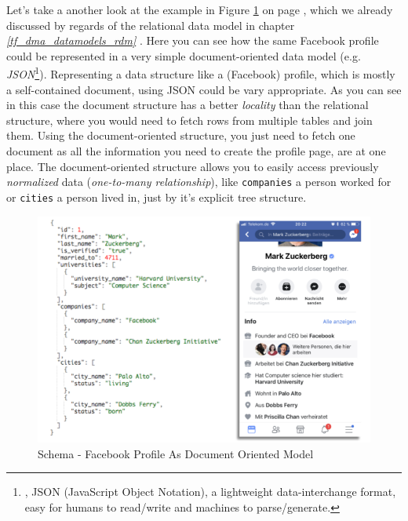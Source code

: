 {Let's take a another look at the example in Figure \ref{schema_facebook_document_oriented_model} on page \pageref{schema_facebook_document_oriented_model}, which we already discussed by regards of the relational data model in chapter \textit{\ref{tf_dma_datamodels_rdm} }. Here you can see how the same Facebook profile could be represented in a very simple document-oriented data model (e.g. \textit{JSON}\footnote{\cite{JSONW}, JSON (JavaScript Object Notation), a lightweight data-interchange format, easy for humans to read/write and machines to parse/generate.}). Representing a data structure like a (Facebook) profile, which is mostly a self-contained document, using JSON could be vary appropriate. As you can see in this case the document structure has a better \textit{locality} than the relational structure, where you would need to fetch rows from multiple tables and join them. Using the document-oriented structure, you just need to fetch one document as all the information you need to create the profile page, are at one place. The document-oriented structure allows you to easily access previously \textit{normalized} data (\textit{one-to-many relationship}), like \lstinline{companies} a person worked for or \lstinline{cities} a person lived in, just by it's explicit tree structure.\\

\begin{figure}[ht]
	\centering
  \includegraphics[width=1\textwidth]{document_oriented_data_model_zuckerberg.png}
	\caption{Schema - Facebook Profile As Document Oriented Model}
	\label{schema_facebook_document_oriented_model}
\end{figure}

}
